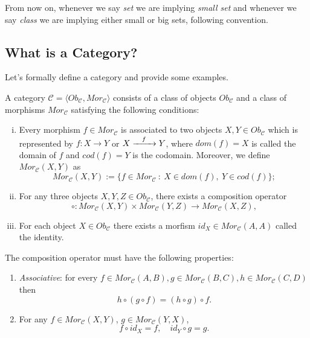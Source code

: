 From now on, whenever we say \textit{set} we are implying \textit{small set}
and whenever we say \textit{class} we are implying either small or big sets,
following \citet{borceux1994handbook} convention.


\subsection{What is a Category?}

Let's formally define a category and provide some examples.

\begin{definition}[Category]
	A category $\mathcal C = \langle Ob_{\mathcal C}, Mor_{\mathcal C} \rangle$ consists
	of a class of objects $Ob_\mathcal C$ and a class of morphisms
	$Mor_\mathcal C$ satisfying the following conditions:
  \begin{enumerate}[(i)]
    \item Every morphism $f \in Mor_\mathcal C$ is associated to two objects $X,Y \in Ob_{\mathcal C}$
      which is represented by $f:X \to Y$ or $X \xrightarrow{\hspace{3mm}f \hspace{3mm}} Y$,
      where $dom(f) = X$ is called the domain of $f$ and $cod(f)=Y$ is the codomain. Moreover, we define
      $Mor_\mathcal C (X,Y)$ as 
      \begin{displaymath}
        Mor_\mathcal C (X,Y) := \{f \in Mor_\mathcal C \ : \ X \in dom(f), \ Y \in cod(f)\};
      \end{displaymath}
    \item For any three objects $X,Y, Z \in Ob_\mathcal C$, there exists a composition operator
      \begin{displaymath}
        \circ: Mor_\mathcal C (X,Y)   \times Mor_\mathcal C (Y,Z) \to Mor_\mathcal C (X,Z),
      \end{displaymath}
      \item For each object $X \in Ob_\mathcal C$ there exists a morfism $id_X \in Mor_\mathcal C (A,A)$
        called the identity.
  \end{enumerate}
  The composition operator must have the following properties:
  \begin{enumerate}[(p.1)]
    \item \textit{Associative}: for every $f \in Mor_\mathcal C (A,B),
      g \in Mor_\mathcal C (B,C), h \in Mor_\mathcal C (C,D)$ then
      \begin{displaymath}
        h \circ (g \circ f) = (h \circ g) \circ f.
      \end{displaymath}
    \item For any $f \in Mor_\mathcal C (X,Y)$, $g \in Mor_\mathcal C (Y,X)$, 
      \begin{displaymath}
        f \circ id_X = f,  \quad id_Y \circ g = g.
      \end{displaymath}
  \end{enumerate}
\end{definition}

